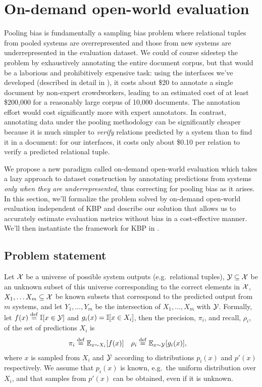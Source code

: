 \section{On-demand open-world evaluation}
\label{sec:method}

Pooling bias is fundamentally a sampling bias problem where relational tuples from pooled systems are overrepresented and those from new systems are underrepresented in the evaluation dataset.
We could of course sidestep the problem by exhaustively annotating the entire document corpus, but that would be a laborious and prohibitively expensive task:
  using the interfaces we've developed (described in detail in ), it costs about \$20 to annotate a single document by non-expert crowdworkers, leading to an estimated cost of at least \$200,000 for a reasonably large corpus of 10,000 documents.
The annotation effort would cost significantly more with expert annotators.
In contrast, annotating data under the pooling methodology can be significantly cheaper because it is much simpler to \textit{verify} relations predicted by a system than to find it in a document: for our interfaces, it costs only about \$0.10 per relation to verify a predicted relational tuple.

We propose a new paradigm called on-demand open-world evaluation which takes a lazy approach to dataset construction by annotating predictions from systems \textit{only when they are underrepresented}, thus correcting for pooling bias as it arises.
In this section, we'll formalize the problem solved by on-demand open-world evaluation independent of KBP and describe our solution that allows us to accurately estimate evaluation metrics without bias in a cost-effective manner. 
We'll then instantiate the framework for KBP in .

\subsection{Problem statement}
Let $\mathcal{X}$ be a universe of possible system outputs (e.g.\ relational tuples),
  $\mathcal{Y} \subseteq \mathcal{X}$ be an unknown subset of this universe corresponding to the correct elements in $\mathcal{X}$,
  $X_1, \ldots X_m \subseteq \mathcal{X}$ be known subsets that correspond to the predicted output from $m$ systems,
  and let $Y_1, \ldots, Y_m$ be the intersection of $X_1, \ldots, X_m$ with $\mathcal{Y}$.
Formally, let $f(x) \stackrel{\rm def}{=} \mathbb{I}[x \in \mathcal{Y}]$ and $g_i(x) = \mathbb{I}[x \in X_i]$, then the precision, $\pi_i$, and recall, $\rho_i$, of the set of predictions $X_i$ is
\begin{align*}
  \pi_i  &\stackrel{\rm def}{=} \mathbb{E}_{x \sim X_i}[f(x)] &
  \rho_i &\stackrel{\rm def}{=} \mathbb{E}_{x \sim \mathcal{Y}}[g_i(x)],
\end{align*}
where $x$ is sampled from $X_i$ and $\mathcal{Y}$ according to distributions $p_i(x)$ and $p'(x)$ respectively.
We assume that $p_i(x)$ is known, e.g.\ the uniform distribution over $X_i$, and that samples from $p'(x)$ can be obtained, even if it is unknown.

